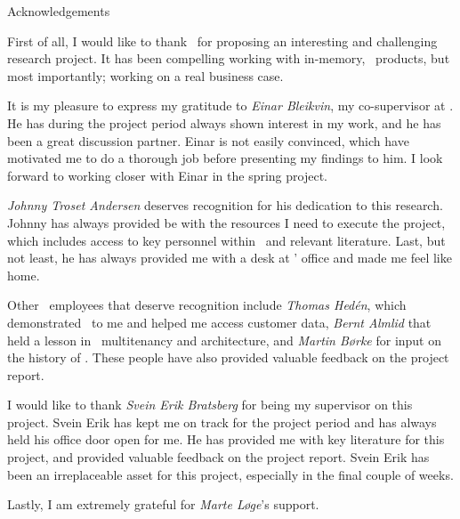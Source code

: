 {\centering

    {\Huge Acknowledgements}
    \vspace{1cm}

    First of all, I would like to thank \genus~for proposing an interesting and challenging research project. It has been compelling working with in-memory, \bd~products, but most importantly; working on a real business case.

    It is my pleasure to express my gratitude to \textit{Einar Bleikvin}, my co-supervisor at \genus. He has during the project period always shown interest in my work, and he has been a great discussion partner. Einar is not easily convinced, which have motivated me to do a thorough job before presenting my findings to him. I look forward to working closer with Einar in the spring project.

    \textit{Johnny Troset Andersen} deserves recognition for his dedication to this research. Johnny has always provided be with the resources I need to execute the project, which includes access to key personnel within \genus~and relevant literature. Last, but not least, he has always provided me with a desk at \genus' office and made me feel like home.

    Other \genus~employees that deserve recognition include \textit{Thomas Hedén}, which demonstrated \qlikview~to me and helped me access customer data, \textit{Bernt Almlid} that held a lesson in \genusSoftware~multitenancy and architecture, and \textit{Martin Børke} for input on the history of \bi. These people have also provided valuable feedback on the project report.

    I would like to thank \textit{Svein Erik Bratsberg} for being my supervisor on this project. Svein Erik has kept me on track for the project period and has always held his office door open for me. He has provided me with key literature for this project, and provided valuable feedback on the project report. Svein Erik has been an irreplaceable asset for this project, especially in the final couple of weeks.

    Lastly, I am extremely grateful for \textit{Marte Løge}'s support.

}
